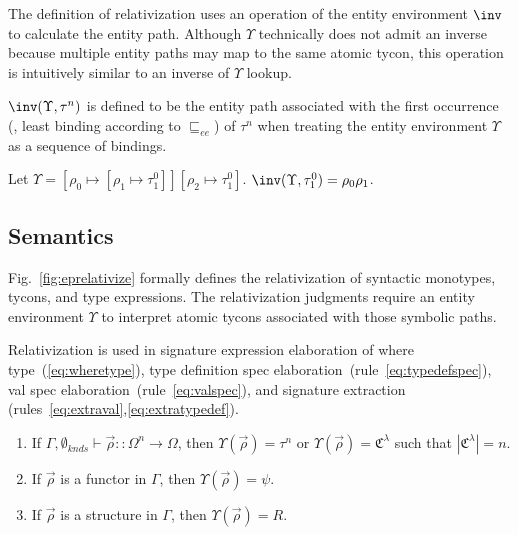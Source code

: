 \documentclass[9pt,nocopyrightspace, fleqn]{sigplanconf}
\begin{document}
The definition of relativization
uses an operation of the entity environment $\inv$ to
calculate the entity path. Although $\Upsilon$ technically does not
admit an inverse because multiple entity paths may map to the same
atomic tycon, this operation is intuitively similar to an inverse of $\Upsilon$ lookup. 

\begin{definition}
$\inv(\Upsilon,\tau^n)$ is defined to be the entity path associated
with the first occurrence (\ie, least binding according to $\sqsubseteq_{ee}$) of $\tau^n$ when treating the entity environment $\Upsilon$ as a sequence of bindings. 
\end{definition}

\begin{example}
Let $\Upsilon=[\rho_0\mapsto [\rho_1\mapsto \tau^0_1]][\rho_2\mapsto \tau^0_1]$. $\inv(\Upsilon,\tau^0_1) = \rho_0\rho_1$. 
\end{example}

\subsection{Semantics}

Fig.~\ref{fig:eprelativize} formally defines the relativization of
syntactic monotypes, tycons, and type expressions. 
The relativization judgments require an
entity environment $\Upsilon$ to interpret atomic tycons associated
with those symbolic paths.

Relativization is used in signature expression elaboration of where type~(\ref{eq:wheretype}), type definition spec elaboration~(rule~\ref{eq:typedefspec}), val spec elaboration~(rule~\ref{eq:valspec}), and signature extraction (rules~\ref{eq:extraval},\ref{eq:extratypedef}). 

\begin{definition}\label{def:wellformedentenvs}
\begin{enumerate}
\item If $\Gamma,\emptyset_{knds} \vdash \vec{\rho} :: \Omega^n \to \Omega$, then $\Upsilon(\vec{\rho}) = \tau^n$ or $\Upsilon(\vec{\rho}) = \mathfrak{C}^\lambda$ such that $|\mathfrak{C}^\lambda| = n$. 

\item If $\vec{\rho}$ is a functor in $\Gamma$, then $\Upsilon(\vec{\rho}) = \psi$. 

\item If $\vec{\rho}$ is a structure in $\Gamma$, then $\Upsilon(\vec{\rho}) = R$. 
\end{enumerate}
\end{definition}
\end{document}
